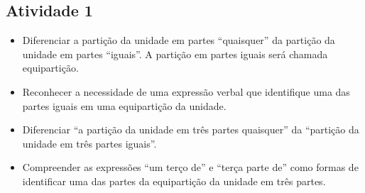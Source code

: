 \begin{multicols}{2}

\subsection{Atividade 1}    \vspace{.1cm}

\begin{itemize} %
    \item       Diferenciar a partição da unidade em partes       ``quaisquer'' da partição da unidade em partes       ``iguais''. A partição em partes iguais será chamada equipartição.
    \item       Reconhecer a necessidade de uma expressão verbal que identifique uma das partes iguais em uma equipartição da unidade.
    \item       Diferenciar       ``a partição da unidade em três partes quaisquer'' da       ``partição da unidade em três partes iguais''.
    \item       Compreender as expressões ``um terço de'' e ``terça parte de'' como formas de identificar uma das partes da equipartição da unidade em três partes.
\end{itemize} %
 \vspace{.1cm}


   \vspace{.1cm}


\end{multicols}
